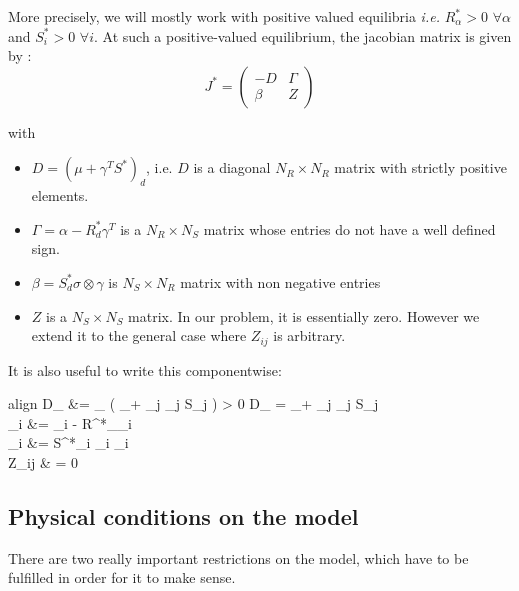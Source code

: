 \documentclass[12pt]{article}
\newcommand{\ie}{\textit{i.e.} }
\begin{document}
	 More precisely, we will mostly work with positive valued equilibria \ie $R^*_\alpha > 0$ $\forall \alpha$ and $S^*_i > 0$ $\forall i$. At such a positive-valued equilibrium, the jacobian matrix is given by :
	\begin{equation}
		J^* = 
		\begin{pmatrix}
		-D & \Gamma \\
		\beta & Z
		\end{pmatrix}
	\end{equation}
	
	with 
	\begin{itemize}
		\item $D = \left(\mu+\gamma^T S^*\right)_d$, i.e. $D$ is a diagonal $N_R \times N_R$ matrix with strictly positive elements.
		\item $\Gamma = \alpha - R^*_d \gamma^T $ is a $N_R \times N_S$ matrix whose entries do not have a well defined sign.
		\item $\beta = S^*_d \sigma \otimes \gamma $ is $N_S \times N_R$ matrix with non negative entries
		\item $Z$ is a $N_S \times N_S$ matrix. In our problem, it is essentially zero. However we extend it to the general case where $Z_{ij}$ is arbitrary.
	\end{itemize}
	
	It is also useful to write this componentwise:
	
	\begin{empheq}{align}
		D_{\alpha\beta} &= \delta_{\alpha\beta} \left( \mu_\alpha + \sum_j \gamma_{j\alpha} S_j \right) > 0  D_{\alpha} =  \mu_\alpha + \sum_j \gamma_{j\alpha} S_j \\
		\Gamma_{\alpha i} &= \alpha_{\alpha i} - R^*_\alpha \gamma_{i \alpha} \\
		\beta_{i \alpha} &= S^*_i \sigma_{i \alpha} \gamma_{i \alpha}  \\
		Z_{ij} & = 0 \\
	\end{empheq}
		\subsection{Physical conditions on the model}
	There are two really important restrictions on the model, which have to be fulfilled in order for it to make sense.
\end{document}
